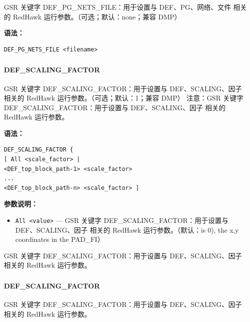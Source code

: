 GSR 关键字 DEF_PG_NETS_FILE：用于设置与 DEF、PG、网络、文件 相关的 RedHawk 运行参数。（可选；默认：none；兼容 DMP）

\textbf{语法：}
\begin{lstlisting}
DEF_PG_NETS_FILE <filename>
\end{lstlisting}

\subsubsection{}
\paragraph*{DEF_SCALING_FACTOR}

GSR 关键字 DEF_SCALING_FACTOR：用于设置与 DEF、SCALING、因子 相关的 RedHawk 运行参数。（可选；默认：1；兼容 DMP） 注意：GSR 关键字 DEF_SCALING_FACTOR：用于设置与 DEF、SCALING、因子 相关的 RedHawk 运行参数。

\textbf{语法：}
\begin{lstlisting}
DEF_SCALING_FACTOR {
[ All <scale_factor> |
<DEF_top_block_path-1> <scale_factor>
...
<DEF_top_block_path-n> <scale_factor> ]
\end{lstlisting}

\textbf{参数说明：}
\begin{itemize}
\item \texttt{All <value>} — GSR 关键字 DEF\_SCALING\_FACTOR：用于设置与 DEF、SCALING、因子 相关的 RedHawk 运行参数。（默认：is 0), the x,y coordinates in the PAD\_FI）
\end{itemize}

\begin{noteBox}
GSR 关键字 DEF\_SCALING\_FACTOR：用于设置与 DEF、SCALING、因子 相关的 RedHawk 运行参数。
\end{noteBox}

\subsubsection{}
\paragraph*{DEF_SCALING_FACTOR}

GSR 关键字 DEF_SCALING_FACTOR：用于设置与 DEF、SCALING、因子 相关的 RedHawk 运行参数。

\subsubsection{}
